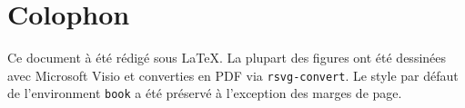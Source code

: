 \section{Colophon}

Ce document à été rédigé sous \LaTeX. La plupart des figures ont été dessinées avec Microsoft Visio et converties en PDF via \texttt{rsvg-convert}. Le style par défaut de l'environment \texttt{book} a été préservé à l'exception des marges de page.
